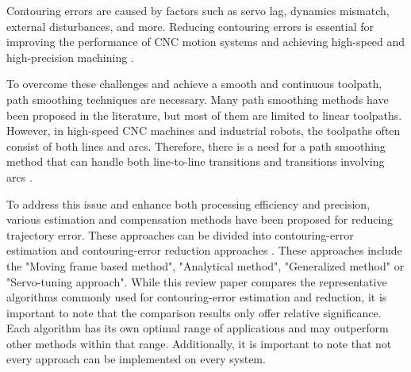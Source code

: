 Contouring errors are caused by factors such as servo lag, dynamics mismatch, external disturbances, and more. Reducing contouring errors is essential for improving the performance of CNC motion systems and achieving high-speed and high-precision machining \cite{Jia.2018}. 

To overcome these challenges and achieve a smooth and continuous toolpath, path smoothing techniques are necessary. Many path smoothing methods have been proposed in the literature, but most of them are limited to linear toolpaths. However, in high-speed CNC machines and industrial robots, the toolpaths often consist of both lines and arcs. Therefore, there is a need for a path smoothing method that can handle both line-to-line transitions and transitions involving arcs \cite{Shahzadeh.2018}. 


To address this issue and enhance both processing efficiency and precision, various estimation and compensation methods have been proposed for reducing trajectory error. These approaches can be divided into contouring-error estimation and contouring-error reduction approaches \cite{Jia.2018}. These approaches include the "Moving frame based method", "Analytical method", "Generalized method" or "Servo-tuning
approach". While this review paper compares the representative algorithms commonly used for contouring-error estimation and reduction, it is important to note that the comparison results only offer relative significance. Each algorithm has its own optimal range of applications and may outperform other methods within that range. Additionally, it is important to note that not every approach can be implemented on every system.







